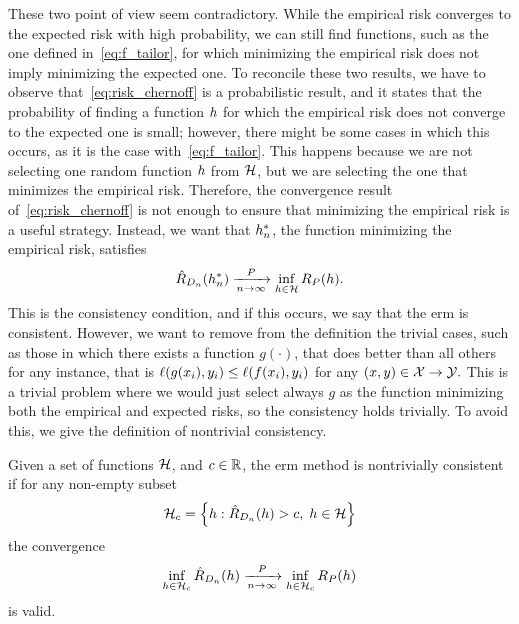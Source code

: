 %
These two point of view seem contradictory. While the empirical risk converges to the expected risk with high probability, we can still find functions, such as the one defined in~\eqref{eq:f_tailor}, for which minimizing the empirical risk does not imply minimizing the expected one.
%
To reconcile these two results, we have to observe that~\eqref{eq:risk_chernoff} is a probabilistic result, and it states that the probability of finding a function $h$ for which the empirical risk does not converge to the expected one is small; however, there might be some cases in which this occurs, as it is the case with~\eqref{eq:f_tailor}. This happens because we are not selecting one random function $h$ from $\mathcal{H}$, but we are selecting the one that minimizes the empirical risk.
%
Therefore, the convergence result of~\eqref{eq:risk_chernoff} is not enough to ensure that minimizing the empirical risk is a useful strategy.
%
Instead, we want that ${h}^*_n$, the function  minimizing the empirical risk, satisfies
\begin{equation}
    \nonumber
    \hat{R}_{D_{n}}({h}^*_n) \xrightarrow[n \to \infty]{P} \inf_{h \in \mathcal{H}} R_P(h) .
\end{equation}
This is the consistency condition, and if this occurs, we say that the \acrshort{erm} is consistent.
However, we want to remove from the definition the trivial cases, such as those in which there exists a function $g(\cdot)$, that does better than all others for any instance, that is 
$\ell(g(x_i), y_i) \leq \ell(f(x_i), y_i)$ for any $(x, y) \in \mathcal{X} \to \mathcal{Y}.$
This is a trivial problem where we would just select always $g$ as the function minimizing both the empirical and expected risks, so the consistency holds trivially.
To avoid this, we give the definition of nontrivial consistency.
\begin{definition}
    Given a set of functions $\mathcal{H}$, and $c \in \mathbb{R}$, the \acrshort{erm} method is nontrivially consistent if for any non-empty subset 
    \begin{equation}
        \nonumber
        \mathcal{H}_c = \left\{h: \hat{R}_{D_{n}}(h) > c, \; h \in \mathcal{H}\right\}
    \end{equation}
    the convergence
    \begin{equation}
        \nonumber
        \inf_{h \in \mathcal{H}_c} \hat{R}_{D_{n}}(h) \xrightarrow[n \to \infty]{P} \inf_{h \in \mathcal{H}_c} R_P(h) 
    \end{equation}
    is valid.
\end{definition}
